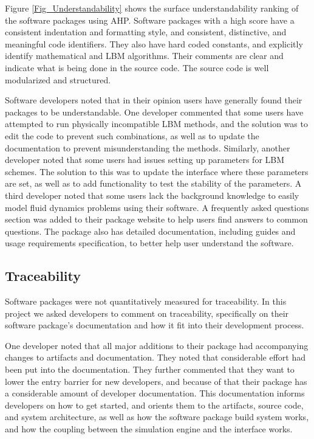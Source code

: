\documentclass[12pt, notitlepage]{article}
\begin{document}
Figure \ref{Fig_Understandability} shows the surface understandability ranking of the software packages using AHP. Software packages with a high score have a consistent indentation and formatting style, and consistent, distinctive, and meaningful code identifiers. They also have hard coded constants, and explicitly identify mathematical and LBM algorithms. Their comments are clear and indicate what is being done in the source code. The source code is well modularized and structured.  

Software developers noted that in their opinion users have generally found their packages to be understandable. One developer commented that some users have attempted to run physically incompatible LBM methods, and the solution was to edit the code to prevent such combinations, as well as to update the documentation to prevent misunderstanding the methods. Similarly, another developer noted that some users had issues setting up parameters for LBM schemes. The solution to this was to update the interface where these parameters are set, as well as to add functionality to test the stability of the parameters. A third developer noted that some users lack the background knowledge to easily model fluid dynamics problems using their software. A frequently asked questions section was added to their package website to help users find answers to common questions. The package also has detailed documentation, including guides and usage requirements specification, to better help user understand the software.

\subsection{Traceability}

Software packages were not quantitatively measured for traceability.
In this project we asked developers to comment on traceability, specifically on their software package's documentation and how it fit into their development process. 

One developer noted that all major additions to their package had accompanying changes to artifacts and documentation. They noted that considerable effort had been put into the documentation. They further commented that they want to lower the entry barrier for new developers, and because of that their package has a considerable amount of developer documentation. This documentation informs developers on how to get started, and orients them to the artifacts, source code, and system architecture, as well as how the software package build system works, and how the coupling between the simulation engine and the interface works. 
\end{document}
